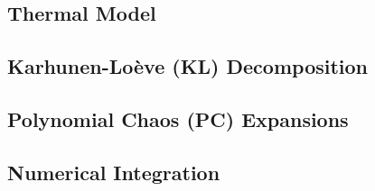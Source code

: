 \subsection{Thermal Model} 


\subsection{Karhunen-Lo\`{e}ve (KL) Decomposition} 


\subsection{Polynomial Chaos (PC) Expansions} 


\subsection{Numerical Integration} 

